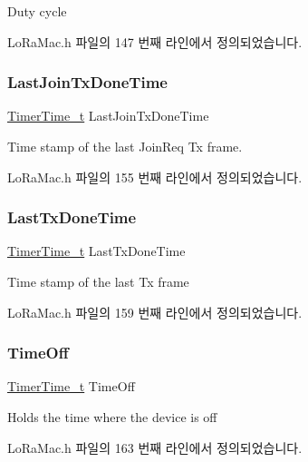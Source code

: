 Duty cycle 

Lo\+Ra\+Mac.\+h 파일의 147 번째 라인에서 정의되었습니다.

\mbox{\label{structs_band_a0e59dea87537a3d472a44694fc2be894}} 
\subsubsection{\texorpdfstring{Last\+Join\+Tx\+Done\+Time}{LastJoinTxDoneTime}}
{\footnotesize\ttfamily \mbox{\hyperlink{utilities_8h_a4215ca43d3e953099ea758ce428599d0}{Timer\+Time\+\_\+t}} Last\+Join\+Tx\+Done\+Time}

Time stamp of the last Join\+Req Tx frame. 

Lo\+Ra\+Mac.\+h 파일의 155 번째 라인에서 정의되었습니다.

\mbox{\label{structs_band_a7316dfb002c4e0015fceeb727020fe5c}} 
\subsubsection{\texorpdfstring{Last\+Tx\+Done\+Time}{LastTxDoneTime}}
{\footnotesize\ttfamily \mbox{\hyperlink{utilities_8h_a4215ca43d3e953099ea758ce428599d0}{Timer\+Time\+\_\+t}} Last\+Tx\+Done\+Time}

Time stamp of the last Tx frame 

Lo\+Ra\+Mac.\+h 파일의 159 번째 라인에서 정의되었습니다.

\mbox{\label{structs_band_a4de67f0652eb4259907c41ea8056c318}} 
\subsubsection{\texorpdfstring{Time\+Off}{TimeOff}}
{\footnotesize\ttfamily \mbox{\hyperlink{utilities_8h_a4215ca43d3e953099ea758ce428599d0}{Timer\+Time\+\_\+t}} Time\+Off}

Holds the time where the device is off 

Lo\+Ra\+Mac.\+h 파일의 163 번째 라인에서 정의되었습니다.

